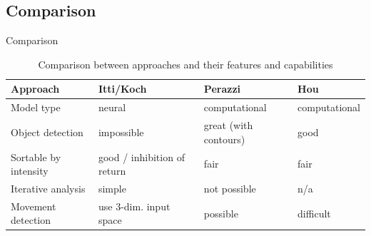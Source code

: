 \documentclass[compress,t]{beamer}
\begin{document}
\subsection{Comparison}
\begin{frame}{Comparison}
    \begin{table}[hbt]
        \tiny
        {
        \def\arraystretch{1.5}
        \begin{tabularx}{\textwidth}{lXXX}
        \hline
        \textbf{Approach}
            & \textbf{Itti/Koch} 
            & \textbf{Perazzi}
            & \textbf{Hou} \\ 
        \hline
        Model type
            & neural
            & computational
            & computational \\
        \hline
        Object detection     
            & impossible              
            & great (with contours)
            & good \\
        Sortable by intensity 
            & good / inhibition of return              
            & fair
            & fair \\
        Iterative analysis  
            & simple
            & not possible
            & n/a \\
        Movement detection      
            & use 3-dim. input space
            & possible
            & difficult \\
        \hline
        \end{tabularx}
        }

        \caption{Comparison between approaches and their features and capabilities}
        \label{tbl:comparison}
    \end{table}
\end{frame}
\end{document}
